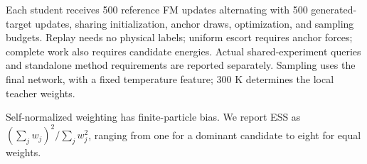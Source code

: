 Each student receives 500 reference FM updates alternating with 500 generated-target updates, sharing initialization, anchor draws, optimization, and sampling budgets. Replay needs no physical labels; uniform escort requires anchor forces; complete work also requires candidate energies. Actual shared-experiment queries and standalone method requirements are reported separately. Sampling uses the final network, with a fixed temperature feature; 300 K determines the local teacher weights.

Self-normalized weighting has finite-particle bias. We report ESS as $(\sum_j w_j)^2/\sum_j w_j^2$, ranging from one for a dominant candidate to eight for equal weights.



